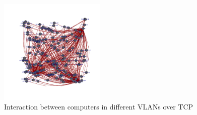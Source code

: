 \begin{figure}[!hbt]\centering
  \includegraphics[width=0.45\textwidth]{graphics/interaction_between_local_computers_over_tcp.pdf}
  \caption{Interaction between computers in different VLANs over TCP}
  \label{fig:interaction}
\end{figure}


